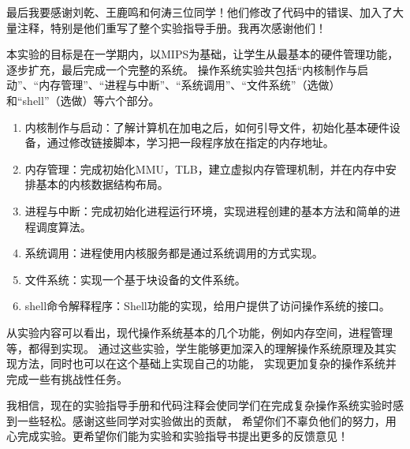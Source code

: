 最后我要感谢刘乾、王鹿鸣和何涛三位同学！他们修改了代码中的错误、加入了大量注释，特别是他们重写了整个实验指导手册。我再次感谢他们！

本实验的目标是在一学期内，以MIPS为基础，让学生从最基本的硬件管理功能，逐步扩充，最后完成一个完整的系统。
操作系统实验共包括“内核制作与启动”、“内存管理”、“进程与中断”、“系统调用”、“文件系统”（选做）和“shell”（选做）等六个部分。
\begin{enumerate}
 \item 内核制作与启动：了解计算机在加电之后，如何引导文件，初始化基本硬件设备，通过修改链接脚本，学习把一段程序放在指定的内存地址。
 \item 内存管理：完成初始化MMU，TLB，建立虚拟内存管理机制，并在内存中安排基本的内核数据结构布局。
 \item 进程与中断：完成初始化进程运行环境，实现进程创建的基本方法和简单的进程调度算法。
 \item 系统调用：进程使用内核服务都是通过系统调用的方式实现。
 \item 文件系统：实现一个基于块设备的文件系统。
 \item shell命令解释程序：Shell功能的实现，给用户提供了访问操作系统的接口。
\end{enumerate}

从实验内容可以看出，现代操作系统基本的几个功能，例如内存空间，进程管理等，都得到实现。
通过这些实验，学生能够更加深入的理解操作系统原理及其实现方法，同时也可以在这个基础上实现自己的功能，
实现更加复杂的操作系统并完成一些有挑战性任务。

我相信，现在的实验指导手册和代码注释会使同学们在完成复杂操作系统实验时感到一些轻松。感谢这些同学对实验做出的贡献，
希望你们不辜负他们的努力，用心完成实验。更希望你们能为实验和实验指导书提出更多的反馈意见！

